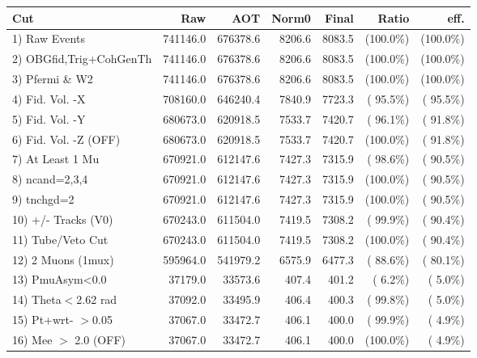  \begin{table}[h!]\centering
 \begin{tabular}{||l||r|r|r|r|r|r||}
 \hline
 \hline
 Cut & Raw & AOT & Norm0 & Final & Ratio & eff.       \\
 \hline
  1) Raw Events           &     741146.0 &     676378.6 &       8206.6 &       8083.5 & (100.0\%) & (100.0\%) \\
  2) OBGfid,Trig+CohGenTh &     741146.0 &     676378.6 &       8206.6 &       8083.5 & (100.0\%) & (100.0\%) \\
  3) Pfermi \& W2         &     741146.0 &     676378.6 &       8206.6 &       8083.5 & (100.0\%) & (100.0\%) \\
  4) Fid. Vol. -X         &     708160.0 &     646240.4 &       7840.9 &       7723.3 & ( 95.5\%) & ( 95.5\%) \\
  5) Fid. Vol. -Y         &     680673.0 &     620918.5 &       7533.7 &       7420.7 & ( 96.1\%) & ( 91.8\%) \\
  6) Fid. Vol. -Z (OFF)   &     680673.0 &     620918.5 &       7533.7 &       7420.7 & (100.0\%) & ( 91.8\%) \\
  7) At Least 1 Mu        &     670921.0 &     612147.6 &       7427.3 &       7315.9 & ( 98.6\%) & ( 90.5\%) \\
  8) ncand=2,3,4          &     670921.0 &     612147.6 &       7427.3 &       7315.9 & (100.0\%) & ( 90.5\%) \\
  9) tnchgd=2             &     670921.0 &     612147.6 &       7427.3 &       7315.9 & (100.0\%) & ( 90.5\%) \\
 10) +/- Tracks (V0)      &     670243.0 &     611504.0 &       7419.5 &       7308.2 & ( 99.9\%) & ( 90.4\%) \\
 11) Tube/Veto Cut        &     670243.0 &     611504.0 &       7419.5 &       7308.2 & (100.0\%) & ( 90.4\%) \\
 12) 2 Muons (1mux)       &     595964.0 &     541979.2 &       6575.9 &       6477.3 & ( 88.6\%) & ( 80.1\%) \\
 13) PmuAsym<0.0          &      37179.0 &      33573.6 &        407.4 &        401.2 & (  6.2\%) & (  5.0\%) \\
 14) Theta$<$2.62 rad     &      37092.0 &      33495.9 &        406.4 &        400.3 & ( 99.8\%) & (  5.0\%) \\
 15) Pt+wrt- $>$0.05      &      37067.0 &      33472.7 &        406.1 &        400.0 & ( 99.9\%) & (  4.9\%) \\
 16) Mee $>$ 2.0  (OFF)   &      37067.0 &      33472.7 &        406.1 &        400.0 & (100.0\%) & (  4.9\%) \\

\end{tabular}
\end{table}
